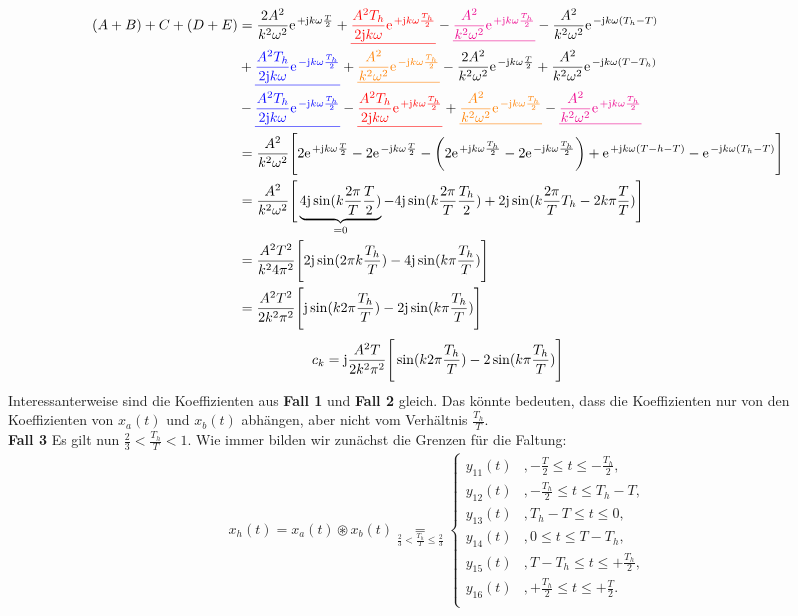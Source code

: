 \documentclass[11pt,a4paper,DIV=12]{scrartcl}
\newcommand{\ured}[1]{\textcolor{red}{\underline{#1}}}
\newcommand{\ublue}[1]{\textcolor{blue}{\underline{#1}}}
\newcommand{\uorange}[1]{\textcolor{orange}{\underline{#1}}}
\newcommand{\umagenta}[1]{\textcolor{magenta}{\underline{#1}}}
\begin{document}
\begin{align}
	(A+B)+C+(D+E)&=\frac{2A^2}{k^2\omega^2}\e^{+\im k \omega \frac{T}{2}}+\ured{\frac{A^2T_h}{2\im k \omega}\e^{+\im k \omega \frac{T_h}{2}}}-\umagenta{\frac{A^2}{k^2\omega^2}\e^{+\im k \omega\frac{T_h}{2}}}-\frac{A^2}{k^2\omega^2}\e^{-\im k \omega (T_h-T)}\nonumber \\
	&+\ublue{\frac{A^2T_h}{2\im k \omega}\e^{-\im k \omega \frac{T_h}{2}}}+\uorange{\frac{A^2}{ k^2 \omega^2}\e^{-\im k \omega \frac{T_h}{2}}}-\frac{2A^2}{k^2\omega^2}\e^{-\im k \omega \frac{T}{2}}+\frac{A^2}{k^2\omega^2}\e^{-\im k \omega (T-T_h)}\nonumber \\
	&-\ublue{\frac{A^2T_h}{2\im k \omega}\e^{-\im k \omega \frac{T_h}{2}}}-\ured{\frac{A^2T_h}{2\im k \omega}\e^{+\im k \omega \frac{T_h}{2}}}+\uorange{\frac{A^2}{k^2\omega^2}\e^{-\im k \omega \frac{T_h}{2}}}-\umagenta{\frac{A^2}{k^2\omega^2}\e^{+\im k \omega \frac{T_h}{2}}}\nonumber \\
	&=\frac{A^2}{k^2\omega^2}\Bigg [2\e^{+\im k \omega\frac{T}{2}}-2\e^{-\im k \omega \frac{T}{2}}-\bigg (2\e^{+\im k \omega \frac{T_h}{2}}-2\e^{-\im k \omega \frac{T_h}{2}}\bigg )+\e^{+\im k \omega(T-h-T)}-\e^{-\im k \omega(T_h-T)}\Bigg ]\nonumber \\
	&=\frac{A^2}{k^2\omega^2}\Bigg [\underbrace{4\im\sin(k\frac {2\pi}{T}\frac{T}{2})}_{=0}-4\im\sin(k \frac{2\pi}{T}\frac{T_h}{2})+2\im\sin(k\frac{2\pi}{T}T_h-2k\pi\frac{T}{T}) \Bigg ]\nonumber \\
	&=\frac{A^2T^2}{k^24\pi^2}\Bigg [2\im\sin(2\pi k \frac{T_h}{T})-4\im\sin(k\pi\frac{T_h}{T})\Bigg ]\nonumber \\
	&=\frac{A^2T^2}{2k^2\pi^2}\Bigg [\im\sin(k2\pi\frac{T_h}{T})-2\im\sin(k\pi\frac{T_h}{T})\Bigg ]
\end{align}
\begin{align}
	c_k=\im\frac{A^2T}{2k^2\pi^2}\Bigg [\sin(k2\pi\frac{T_h}{T})-2\sin(k\pi\frac{T_h}{T})\Bigg]
\end{align}
Interessanterweise sind die Koeffizienten aus \textbf{Fall 1} und \textbf{Fall 2} gleich. Das könnte bedeuten, dass die Koeffizienten nur von den Koeffizienten von $x_{a}(t)$ und $x_{b}(t)$ abhängen, aber nicht vom Verhältnis $\frac{T_h}{T}$.\\
\textbf{Fall 3}
Es gilt nun $\frac{2}{3} < \frac{T_h}{T} < 1$. Wie immer bilden wir zunächst die Grenzen für die Faltung:\\
\begin{align}
	x_{h}(t)=x_{a}(t)\circledast x_{b}(t)\underset{\frac{2}{3}<\frac{T_h}{T}\leq\frac{2}{3}}{=}\begin{cases}
		y_{11}(t)&,-\frac{T}{2}\leq t \leq -\frac{T_h}{2}, \\
		y_{12}(t)&,-\frac{T_h}{2}\leq t \leq T_h-T, \\
		y_{13}(t)&,T_h-T\leq t \leq 0, \\
		y_{14}(t)&,0\leq t \leq T-T_h, \\
		y_{15}(t)&,T-T_h\leq t \leq +\frac{T_h}{2}, \\
		y_{16}(t)&,+\frac{T_h}{2}\leq t \leq +\frac{T}{2}. \\
	\end{cases}
\end{align}
\end{document}
